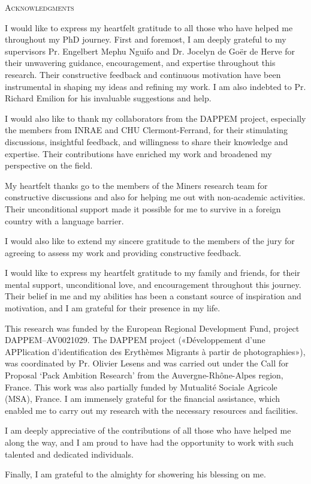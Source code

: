 \begin{center}
	\textsc{Acknowledgments}
\end{center}
%
\noindent
%
I would like to express my heartfelt gratitude to all those who have helped me throughout my PhD journey. First and foremost, I am deeply grateful to my supervisors Pr. Engelbert Mephu Nguifo and  Dr. Jocelyn de Goër de Herve for their unwavering guidance, encouragement, and expertise throughout this research. Their constructive feedback and continuous motivation have been instrumental in shaping my ideas and refining my work. I am also indebted to Pr. Richard Emilion for his invaluable suggestions and help.


I would also like to thank my collaborators from the DAPPEM project, especially the members from INRAE and CHU Clermont-Ferrand, for their stimulating discussions, insightful feedback, and willingness to share their knowledge and expertise. Their contributions have enriched my work and broadened my perspective on the field. 


My heartfelt thanks go to the members of the Miners research team for constructive discussions and also for helping me out with non-academic activities. Their unconditional support made it possible for me to survive in a foreign country with a language barrier.


I would also like to extend my sincere gratitude to the members of the jury for agreeing to assess my work and providing constructive feedback.


I would like to express my heartfelt gratitude to my family and friends, for their mental support, unconditional love, and encouragement throughout this journey. Their belief in me and my abilities has been a constant source of inspiration and motivation, and I am grateful for their presence in my life.

This research was funded by the European Regional Development Fund, project DAPPEM–AV0021029. The DAPPEM project («Développement d’une APPlication d’identification des Erythèmes Migrants à partir de photographies»), was coordinated by Pr. Olivier Lesens and was carried out under the Call for Proposal ‘Pack Ambition Research’ from the Auvergne-Rhône-Alpes region, France. This work was also partially funded by Mutualité Sociale Agricole (MSA), France. I am immensely grateful for the financial assistance, which enabled me to carry out my research with the necessary resources and facilities.

            
I am deeply appreciative of the contributions of all those who have helped me along the way, and I am proud to have had the opportunity to work with such talented and dedicated individuals.


Finally, I am grateful to the almighty for showering his blessing on me.